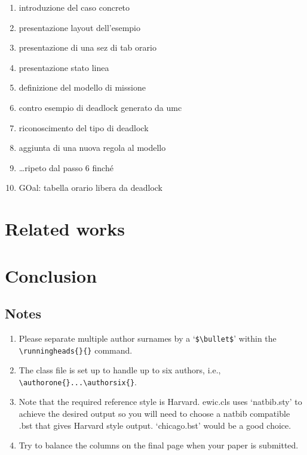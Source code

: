 \documentclass{ewic}
\begin{document}
			
			\begin{enumerate}
			\item introduzione del caso concreto
			\item presentazione layout dell'esempio
			\item presentazione di una sez di tab orario
			\item presentazione stato linea
			\item definizione del modello di missione
			\item contro esempio di deadlock generato da umc
			\item riconoscimento del tipo di deadlock
			\item aggiunta di una nuova regola al modello
			\item \ldots ripeto dal passo 6 finch\'{e}
			\item GOal: tabella orario libera da deadlock
			\end{enumerate}
			
			\section{Related works}
			\section{Conclusion}
			
			
			
			\pagebreak
			\subsection{Notes}
			\begin{enumerate}
			\item Please separate multiple author surnames by a `\verb+$\bullet$+' within the
			\verb+\runningheads{}{}+ command.
			
			\item The class file is set up to handle up to six authors, i.e., \verb+\authorone{}...\authorsix{}+.
			
			\item Note that the required reference style is Harvard. ewic.cls
			uses `natbib.sty' to achieve the desired output so you will need
			to choose a natbib compatible .bst that gives Harvard style
			output. `chicago.bst' would be a good choice.
			
			\item Try to balance the columns on the final page when your paper is submitted.
			\end{enumerate}
			
\end{document}
